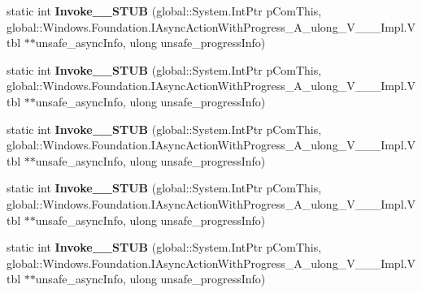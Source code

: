 \begin{DoxyCompactItemize}
\item 
\mbox{\label{struct_windows_1_1_foundation_1_1_async_action_progress_handler___a__ulong___v_______impl_1_1_vtbl_abe24c00d981a0c06ffbbaff7758f1273}} 
static int {\bfseries Invoke\+\_\+\+\_\+\+S\+T\+UB} (global\+::\+System.\+Int\+Ptr p\+Com\+This, global\+::\+Windows.\+Foundation.\+I\+Async\+Action\+With\+Progress\+\_\+\+A\+\_\+ulong\+\_\+\+V\+\_\+\+\_\+\+\_\+\+Impl.\+Vtbl $\ast$$\ast$unsafe\+\_\+async\+Info, ulong unsafe\+\_\+progress\+Info)
\item 
\mbox{\label{struct_windows_1_1_foundation_1_1_async_action_progress_handler___a__ulong___v_______impl_1_1_vtbl_abe24c00d981a0c06ffbbaff7758f1273}} 
static int {\bfseries Invoke\+\_\+\+\_\+\+S\+T\+UB} (global\+::\+System.\+Int\+Ptr p\+Com\+This, global\+::\+Windows.\+Foundation.\+I\+Async\+Action\+With\+Progress\+\_\+\+A\+\_\+ulong\+\_\+\+V\+\_\+\+\_\+\+\_\+\+Impl.\+Vtbl $\ast$$\ast$unsafe\+\_\+async\+Info, ulong unsafe\+\_\+progress\+Info)
\item 
\mbox{\label{struct_windows_1_1_foundation_1_1_async_action_progress_handler___a__ulong___v_______impl_1_1_vtbl_abe24c00d981a0c06ffbbaff7758f1273}} 
static int {\bfseries Invoke\+\_\+\+\_\+\+S\+T\+UB} (global\+::\+System.\+Int\+Ptr p\+Com\+This, global\+::\+Windows.\+Foundation.\+I\+Async\+Action\+With\+Progress\+\_\+\+A\+\_\+ulong\+\_\+\+V\+\_\+\+\_\+\+\_\+\+Impl.\+Vtbl $\ast$$\ast$unsafe\+\_\+async\+Info, ulong unsafe\+\_\+progress\+Info)
\item 
\mbox{\label{struct_windows_1_1_foundation_1_1_async_action_progress_handler___a__ulong___v_______impl_1_1_vtbl_abe24c00d981a0c06ffbbaff7758f1273}} 
static int {\bfseries Invoke\+\_\+\+\_\+\+S\+T\+UB} (global\+::\+System.\+Int\+Ptr p\+Com\+This, global\+::\+Windows.\+Foundation.\+I\+Async\+Action\+With\+Progress\+\_\+\+A\+\_\+ulong\+\_\+\+V\+\_\+\+\_\+\+\_\+\+Impl.\+Vtbl $\ast$$\ast$unsafe\+\_\+async\+Info, ulong unsafe\+\_\+progress\+Info)
\item 
\mbox{\label{struct_windows_1_1_foundation_1_1_async_action_progress_handler___a__ulong___v_______impl_1_1_vtbl_abe24c00d981a0c06ffbbaff7758f1273}} 
static int {\bfseries Invoke\+\_\+\+\_\+\+S\+T\+UB} (global\+::\+System.\+Int\+Ptr p\+Com\+This, global\+::\+Windows.\+Foundation.\+I\+Async\+Action\+With\+Progress\+\_\+\+A\+\_\+ulong\+\_\+\+V\+\_\+\+\_\+\+\_\+\+Impl.\+Vtbl $\ast$$\ast$unsafe\+\_\+async\+Info, ulong unsafe\+\_\+progress\+Info)
\end{DoxyCompactItemize}
